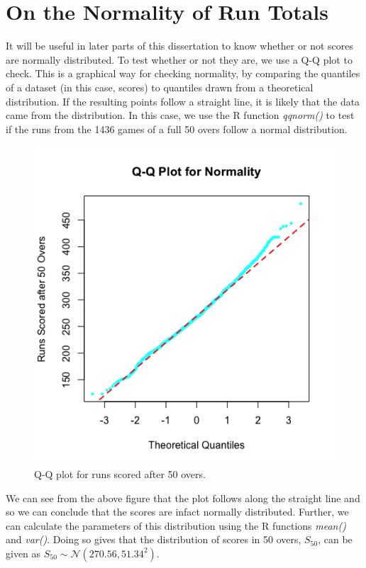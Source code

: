 \section{On the Normality of Run Totals}
It will be useful in later parts of this dissertation to know whether or not scores are normally distributed. To test whether or not 
they are, we use a Q-Q plot to check. This is a graphical way for checking normality, by comparing the quantiles of a dataset (in this case, scores) to quantiles
drawn from a theoretical distribution. If the resulting points follow a straight line, it is likely that the data came from the distribution.
In this case, we use the R function \textit{qqnorm()} to test if the runs from the 1436 games of a full 50 overs follow a normal distribution.

\begin{figure}[h]
    \label{qqplot}
    \centering
    \includegraphics[scale=0.55]{figures/qqnormplot.png}
    \caption{Q-Q plot for runs scored after 50 overs.}
\end{figure}

We can see from the above figure that the plot follows along the straight line and so we can conclude that the scores are infact normally distributed. 
Further, we can calculate the parameters of this distribution using the R functions \textit{mean()} and \textit{var()}. Doing so gives that the distribution
of scores in 50 overs, $S_{50}$, can be given as $S_{50} \sim \mathcal{N}(270.56,51.34^2)$. \\ 

